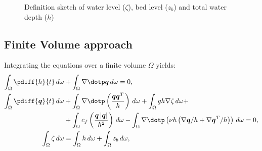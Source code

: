 \vspace{1cm}
\begin{figure}[H]
    \centering
    \begin{center}
        \def\svgwidth{1.0\textwidth} %
        \resizebox{0.9\textwidth}{!}{
            
        }
    \end{center}
    \caption{Definition sketch of water level ($\zeta$), bed level ($z_b$) and total water depth ($h$)}\label{fig:definition_variables_2d}
\end{figure}

\subsection*{Finite Volume approach}
Integrating the equations over a finite volume $\Omega$ yields:
\begin{subequations}
\begin{align}
    \int_\Omega \pdiff{h}{t}\, d\omega &
    + \int_\Omega \nabla \dotp \vec{q}\, d\omega  = 0,
    \label{eq:pressure_dependent_on_zeta_a}
    \\
    \int_\Omega \pdiff{\vec{q}}{t}\, d\omega &
    + \int_\Omega \nabla \dotp \left( \frac{\vec{q}\vec{q}^T}{h} \right)\, d\omega
    + \int_\Omega gh \nabla \zeta\, d\omega +
    \nonumber \\
    & + \int_\Omega c_f \left( \frac{\vec{q}\abs{\vec{q}}}{h^2} \right)\, d\omega
    - \int_\Omega \nabla \dotp \left( \nu h \left(  \nabla \vec{q}/h + \nabla \vec{q}^T/h \right) \right)\, d\omega = 0,
    \label{eq:pressure_dependent_on_zeta_b}
    \\
    \int_\Omega \zeta\, d\omega &
    = \int_\Omega h\, d\omega + \int_\Omega z_b\, d\omega,
    \label{eq:pressure_dependent_on_zeta_c}
\end{align}
\label{eq:pressure_dependent_on_zeta}
\end{subequations}

